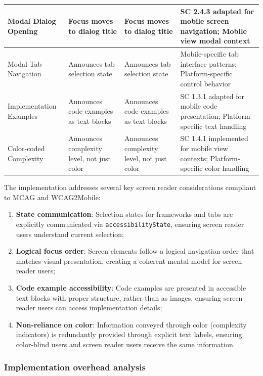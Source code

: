 \begin{longtable}[c]{|C{2.8cm}|C{3.5cm}|C{3.5cm}|C{4cm}|}
\hline
Modal Dialog Opening & {} Focus moves to dialog title & {} Focus moves to dialog title & SC 2.4.3 adapted for mobile screen navigation; Mobile view modal context \\
\hline
Modal Tab Navigation & {} Announces tab selection state & {} Announces tab selection state & Mobile-specific tab interface patterns; Platform-specific control behavior \\
\hline
Implementation Examples & {} Announces code examples as text blocks & {} Announces code examples as text blocks & SC 1.3.1 adapted for mobile code presentation; Platform-specific text handling \\
\hline
Color-coded Complexity & {} Announces complexity level, not just color & {} Announces complexity level, not just color & SC 1.4.1 implemented for mobile view contexts; Platform-specific color handling \\
\hline
\end{longtable}

\FloatBarrier

The implementation addresses several key screen reader considerations compliant to MCAG and WCAG2Mobile:

\begin{enumerate}
    \item \textbf{State communication}: Selection states for frameworks and tabs are explicitly communicated via \texttt{accessibilityState}, ensuring screen reader users understand current selection;
    
    \item \textbf{Logical focus order}: Screen elements follow a logical navigation order that matches visual presentation, creating a coherent mental model for screen reader users;
    
    \item \textbf{Code example accessibility}: Code examples are presented in accessible text blocks with proper structure, rather than as images, ensuring screen reader users can access implementation details;
    
    \item \textbf{Non-reliance on color}: Information conveyed through color (complexity indicators) is redundantly provided through explicit text labels, ensuring color-blind users and screen reader users receive the same information.
\end{enumerate}

\subsubsection{Implementation overhead analysis}

